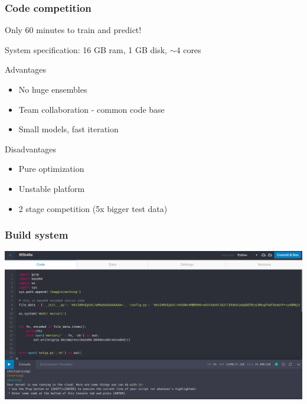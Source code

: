 \begin{frame}
\frametitle{Code competition}


Only 60 minutes to train and predict!

\hfill

System specification: 16 GB ram, 1 GB disk, $\sim4$ cores

\hfill

Advantages
\begin{itemize}
\item No huge ensembles %
\item Team collaboration - common code base %
\item Small models, fast iteration
\end{itemize}

Disadvantages
\begin{itemize}
\item Pure optimization %
\item Unstable platform %
\item 2 stage competition (5x bigger test data)
\end{itemize}
\end{frame}

\begin{frame}
\frametitle{Build system}
\includegraphics[width=14cm]{img/kernel-code.png}
\end{frame}

